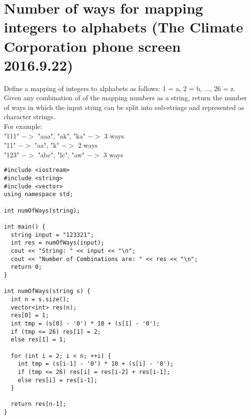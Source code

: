 \section{Number of ways for mapping integers to alphabets (The Climate Corporation phone screen 2016.9.22)}
Define a mapping of integers to alphabets as follows: 1 = a, 2 = b, ..., 26 = z. Given any combination of of the mapping numbers as a string, return the number of ways in which the input string can be split into sub-strings and represented as character strings. \\

For example:\\
"111" $->$ "aaa", "ak", "ka" $->$ 3 ways\\
"11" $->$ "aa", "k" $->$ 2 ways\\
"123" $->$ "abc", "lc", "aw" $->$ 3 ways\\

\begin{lstlisting}
#include <iostream>
#include <string>
#include <vector>
using namespace std;

int numOfWays(string);

int main() {
  string input = "123321";
  int res = numOfWays(input);
  cout << "String: " << input << "\n";
  cout << "Number of Combinations are: " << res << "\n";
  return 0;
}

int numOfWays(string s) {
  int n = s.size();
  vector<int> res(n);
  res[0] = 1;
  int tmp = (s[0] - '0') * 10 + (s[1] - '0');
  if (tmp <= 26) res[1] = 2;
  else res[1] = 1;
  
  for (int i = 2; i < n; ++i) {
    int tmp = (s[i-1] - '0') * 10 + (s[i] - '0');    
    if (tmp <= 26) res[i] = res[i-2] + res[i-1];
    else res[i] = res[i-1];
  }
    
  return res[n-1];
}
\end{lstlisting}

